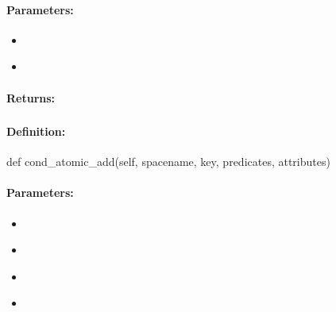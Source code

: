\paragraph{Parameters:}
\begin{itemize}[noitemsep]
\item {}\\

\item {}\\

\end{itemize}

\paragraph{Returns:}


\pagebreak
\subsubsection{}
\label{api:python:cond_atomic_add}


\paragraph{Definition:}
\begin{pythoncode}
def cond_atomic_add(self, spacename, key, predicates, attributes)
\end{pythoncode}

\paragraph{Parameters:}
\begin{itemize}[noitemsep]
\item {}\\

\item {}\\

\item {}\\

\item {}\\

\end{itemize}

